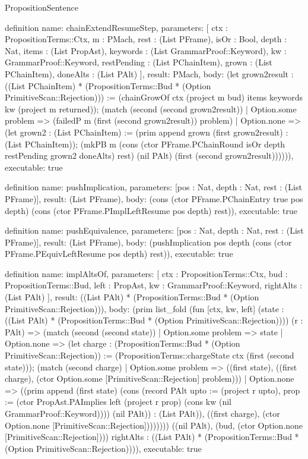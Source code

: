 \begin{lexlean}{PropositionSentence}
\begin{semanticmodule}
definition{
  name: chainExtendResumeStep,
  parameters: [
    ctx : PropositionTerms::Ctx,
    m : PMach,
    rest : (List PFrame),
    isOr : Bool,
    depth : Nat,
    items : (List PropAst),
    keywords : (List GrammarProof::Keyword),
    kw : GrammarProof::Keyword,
    restPending : (List PChainItem),
    grown : (List PChainItem),
    doneAlts : (List PAlt)
  ],
  result: PMach,
  body: (let grown2result : ((List PChainItem) * (PropositionTerms::Bud * (Option PrimitiveScan::Rejection))) := (chainGrowOf ctx (project m bud) items keywords kw (project m returned)); (match (second (second grown2result))
    | Option.some problem => (failedP m (first (second grown2result)) problem)
    | Option.none => (let grown2 : (List PChainItem) := (prim append grown (first grown2result) : (List PChainItem)); (mkPB m (cons (ctor PFrame.PChainRound isOr depth restPending grown2 doneAlts) rest) (nil PAlt) (first (second grown2result)))))),
  executable: true
}

definition{
  name: pushImplication,
  parameters: [pos : Nat, depth : Nat, rest : (List PFrame)],
  result: (List PFrame),
  body: (cons (ctor PFrame.PChainEntry true pos depth) (cons (ctor PFrame.PImplLeftResume pos depth) rest)),
  executable: true
}

definition{
  name: pushEquivalence,
  parameters: [pos : Nat, depth : Nat, rest : (List PFrame)],
  result: (List PFrame),
  body: (pushImplication pos depth (cons (ctor PFrame.PEquivLeftResume pos depth) rest)),
  executable: true
}

definition{
  name: implAltsOf,
  parameters: [
    ctx : PropositionTerms::Ctx,
    bud : PropositionTerms::Bud,
    left : PropAst,
    kw : GrammarProof::Keyword,
    rightAlts : (List PAlt)
  ],
  result: ((List PAlt) * (PropositionTerms::Bud * (Option PrimitiveScan::Rejection))),
  body: (prim list_fold (fun [ctx, kw, left] (state : ((List PAlt) * (PropositionTerms::Bud * (Option PrimitiveScan::Rejection)))) (r : PAlt) => (match (second (second state))
    | Option.some problem => state
    | Option.none => (let charge : (PropositionTerms::Bud * (Option PrimitiveScan::Rejection)) := (PropositionTerms::chargeState ctx (first (second state))); (match (second charge)
        | Option.some problem => ((first state), ((first charge), (ctor Option.some [PrimitiveScan::Rejection] problem)))
        | Option.none => ((prim append (first state) (cons (record PAlt {upto := (project r upto), prop := (ctor PropAst.PAImplies left (project r prop) (cons kw (nil GrammarProof::Keyword)))}) (nil PAlt)) : (List PAlt)), ((first charge), (ctor Option.none [PrimitiveScan::Rejection]))))))) ((nil PAlt), (bud, (ctor Option.none [PrimitiveScan::Rejection]))) rightAlts : ((List PAlt) * (PropositionTerms::Bud * (Option PrimitiveScan::Rejection)))),
  executable: true
}


\end{semanticmodule}
\end{lexlean}
